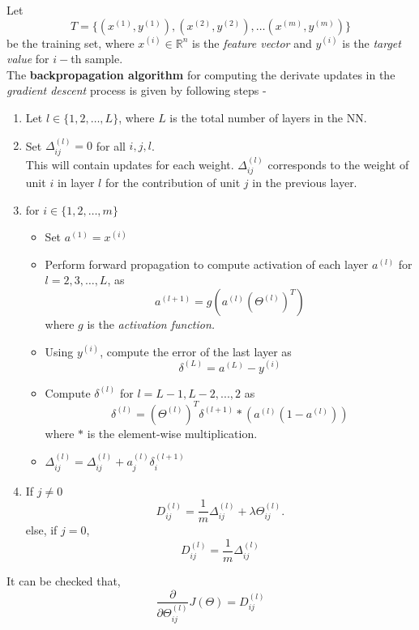 \documentclass[a4paper,10pt,notitlepage]{article}
\begin{document}
Let 
\begin{equation}
T = \{ (x^{(1)}, y^{(1)}), (x^{(2)}, y^{(2)}), \ldots (x^{(m)}, y^{(m)}) \}
\end{equation}
be the training set, where $x^{(i)} \in \mathbb{R}^n$ is the {\em feature vector} and $y^{(i)}$ is the {\em target value} for $i-$th sample. \\
The {\bf backpropagation algorithm} for computing the derivate updates in the {\em gradient descent} process is given by following steps - 
\begin{enumerate}
\item Let $l \in \{ 1,2,\ldots, L \}$, where $L$ is the total number of layers in the NN. 
\item Set $\Delta_{ij}^{(l)} = 0$ for all $i,j,l$. \\
This will contain updates for each weight. $\Delta_{ij}^{(l)}$ corresponds to the weight of unit $i$ in layer $l$ for the contribution of unit $j$ in the previous layer. 
\item for $i \in \{ 1, 2, \ldots, m \}$
\begin{itemize}
\item Set $a^{(1)} = x^{(i)}$
\item Perform forward propagation to compute activation of each layer $a^{(l)}$ for $l = 2,3, \ldots ,L$, as 
\begin{equation*}
a^{(l+1)} = g(a^{(l)}(\Theta^{(l)})^{T})
\end{equation*}
where $g$ is the {\em activation function.}
\item Using $y^{(i)}$, compute the error of the last layer as
\begin{equation*}
\delta^{(L)} = a^{(L)} - y^{(i)}
\end{equation*}
\item Compute $\delta^{(l)}$ for $l=L-1, L-2, ..., 2$ as
\begin{equation*}
\delta^{(l)} = (\Theta^{(l)})^T \delta^{(l+1)}*(a^{(l)} (1 - a^{(l)}))
\end{equation*}
where $*$ is the element-wise multiplication.
\item $\Delta_{ij}^{(l)} = \Delta_{ij}^{(l)} + a_{j}^{(l)} \delta_{i}^{(l+1)}$
\end{itemize}
\item If $j \neq 0$
\begin{equation*}
D_{ij}^{(l)} = \frac{1}{m} \Delta_{ij}^{(l)} + \lambda \Theta_{ij}^{(l)}.
\end{equation*}
else, if $j = 0$,
\begin{equation*}
D_{ij}^{(l)} = \frac{1}{m} \Delta_{ij}^{(l)}
\end{equation*}
\end{enumerate}
It can be checked that, 
\begin{equation*}
\frac{\partial}{\partial \Theta^{(l)}_{ij}} J(\Theta) = D_{ij}^{(l)}
\end{equation*}
\end{document}
